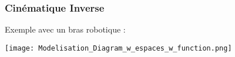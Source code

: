 \documentclass[french]{beamer}
\begin{document}

\begin{frame}
    \frametitle{Cinématique Inverse}

    \large Exemple avec un bras robotique :

    \texttt{[image: Modelisation\_Diagram\_w\_espaces\_w\_function.png]}

\end{frame}


\end{document}
